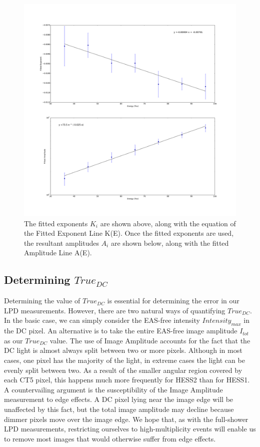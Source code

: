\documentclass[11pt]{article}
\begin{document}
\begin{figure}
\begin{center}
\includegraphics[width=\textwidth]{lpdpowerlaw}
\caption{The fitted exponents $K_{i}$ are shown above, along with the equation of the Fitted Exponent Line K(E). Once the fitted exponents are used, the resultant amplitudes $A_{i}$ are shown below, along with the fitted Amplitude Line A(E).}
\label{fig:powerlawlpd}
\end{center}
\end{figure}

\subsection{Determining $True_{DC}$}
Determining the value of $True_{DC}$ is essential for determining the error in our LPD measurements. However, there are two natural ways of quantifying $True_{DC}$. In the basic case, we can simply consider the EAS-free intensity $Intensity_{max}$ in the DC pixel. An alternative is to take the entire EAS-free image amplitude $I_{tot}$ as our $True_{DC}$ value. The use of Image Amplitude accounts for the fact that the DC light is almost always split between two or more pixels. Although in most cases, one pixel has the majority of the light, in extreme cases the light can be evenly split between two. As a result of the smaller angular region covered by each CT5 pixel, this happens much more frequently for HESS2 than for HESS1. A countervailing argument is the susceptibility of the Image Amplitude measurement to edge effects. A DC pixel lying near the image edge will be unaffected by this fact, but the total image amplitude may decline because dimmer pixels move over the image edge. We hope that, as with the full-shower LPD measurements, restricting ourselves to high-multiplicity events will enable us to remove most images that would otherwise suffer from edge effects.
\end{document}
